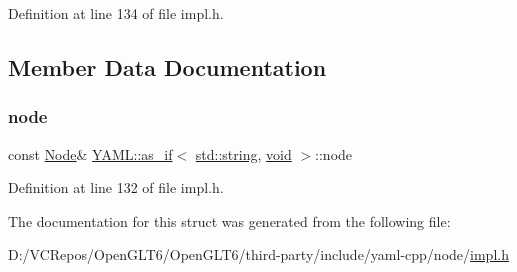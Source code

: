 Definition at line 134 of file impl.\+h.



\subsection{Member Data Documentation}
\mbox{\label{struct_y_a_m_l_1_1as__if_3_01std_1_1string_00_01void_01_4_ad9fe3d3cdd241a2c363772990f50e7da}} 
\subsubsection{\texorpdfstring{node}{node}}
{\footnotesize\ttfamily const \mbox{\hyperlink{class_y_a_m_l_1_1_node}{Node}}\& \mbox{\hyperlink{struct_y_a_m_l_1_1as__if}{Y\+A\+M\+L\+::as\+\_\+if}}$<$ \mbox{\hyperlink{glad_8h_ac83513893df92266f79a515488701770}{std\+::string}}, \mbox{\hyperlink{glad_8h_a950fc91edb4504f62f1c577bf4727c29}{void}} $>$\+::node}



Definition at line 132 of file impl.\+h.



The documentation for this struct was generated from the following file\+:\begin{DoxyCompactItemize}
\item 
D\+:/\+V\+C\+Repos/\+Open\+G\+L\+T6/\+Open\+G\+L\+T6/third-\/party/include/yaml-\/cpp/node/\mbox{\hyperlink{impl_8h}{impl.\+h}}\end{DoxyCompactItemize}
